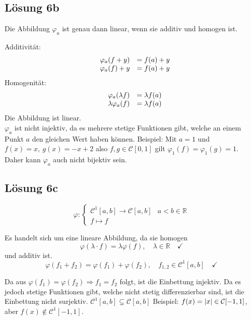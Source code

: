 \documentclass[main.tex]{subfiles}
\begin{document}
\subsection{Lösung 6b}
Die Abbildung $\varphi _{a}$ ist genau dann linear, wenn sie additiv und homogen ist.

Additivität:
\begin{equation*}
    \begin{array}{ r r l }
     & \varphi _{a}( f+y) & =f( a) +y\\
     & \varphi _{a}( f) +y & =f( a) +y
    \end{array}
\end{equation*}
Homogenität:
\begin{equation*}
    \begin{array}{ r r l }
     & \varphi _{a}( \lambda f) & =\lambda f( a)\\
     & \lambda \varphi _{a}( f) & =\lambda f( a)
    \end{array}
\end{equation*}
Die Abbildung ist linear.\\

$\varphi _{a}$ ist nicht injektiv, da es mehrere stetige Funktionen gibt, welche an einem Punkt $a$ den gleichen Wert haben können. Beispiel: Mit $a=1$ und $f( x) =x,\ g( x) =-x+2$ also $f,g\in \mathcal{C}[ 0,1]$ gilt $\varphi _{1}( f) =\varphi _{1}( g) =1.$\\

Daher kann $\varphi _{a}$ auch nicht bijektiv sein.


\subsection{Lösung 6c}
$$
\varphi : \begin{cases}
    \mathcal{C}^1 [a,b] \to \mathcal{C} [a,b] & a < b \in \mathbb{R}\\
    f \mapsto f
\end{cases}
$$

Es handelt sich um eine lineare Abbildung, da sie homogen
$$
    \varphi (\lambda \cdot f) = \lambda \varphi (f),\quad \lambda \in \mathbb{R} \quad \checkmark
$$
und additiv ist.
$$
    \varphi (f_1 + f_2) = \varphi (f_1) + \varphi (f_2),\quad f_{1,2} \in \mathcal{C}^1 [a,b] \quad \checkmark
$$

Da aus $\varphi(f_1) = \varphi (f_2) \Rightarrow f_1 = f_2$ folgt, ist die Einbettung injektiv. 
Da es jedoch stetige Funktionen gibt, welche nicht stetig differenzierbar sind, ist die Einbettung nicht surjektiv. $\mathcal{C}^1 [a,b] \subsetneq \mathcal{C} [a,b]$ Beispiel: $f(x) = \lvert x\rvert \in \mathcal{C} [-1, 1]$, aber $f(x) \notin \mathcal{C}^1 [-1, 1]$.
\end{document}
